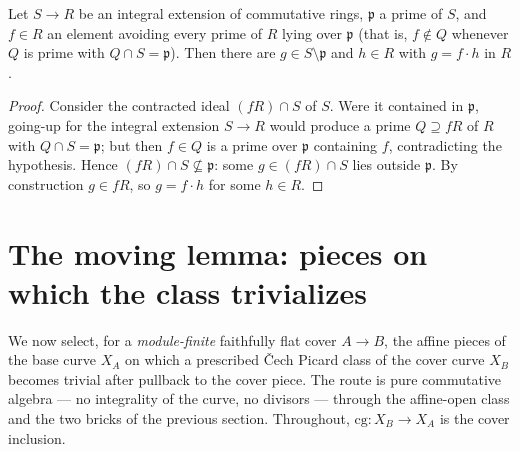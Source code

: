 \begin{lemma}
  \label{lem:algebraic_tube}
  \leanok
  Let \(S \to R\) be an integral extension of commutative rings, \(\mathfrak p\) a prime of \(S\),
  and \(f \in R\) an element avoiding every prime of \(R\) lying over \(\mathfrak p\) (that is,
  \(f \notin Q\) whenever \(Q\) is prime with \(Q \cap S = \mathfrak p\)). Then there are \(g \in S
  \setminus \mathfrak p\) and \(h \in R\) with \(g = f \cdot h\) in \(R\).
\end{lemma}
\begin{proof}
  \leanok
  Consider the contracted ideal \((fR) \cap S\) of \(S\). Were it contained in \(\mathfrak p\),
  going-up for the integral extension \(S \to R\) would produce a prime \(Q \supseteq fR\) of \(R\)
  with \(Q \cap S = \mathfrak p\); but then \(f \in Q\) is a prime over \(\mathfrak p\) containing
  \(f\), contradicting the hypothesis. Hence \((fR) \cap S \not\subseteq \mathfrak p\): some
  \(g \in (fR) \cap S\) lies outside \(\mathfrak p\). By construction \(g \in fR\), so \(g = f \cdot
  h\) for some \(h \in R\).
\end{proof}

\section{The moving lemma: pieces on which the class trivializes}
\label{sec:effectivityMoving}

We now select, for a \emph{module-finite} faithfully flat cover \(A \to B\), the affine pieces of the
base curve \(X_A\) on which a prescribed \v Cech Picard class of the cover curve \(X_B\) becomes
trivial after pullback to the cover piece. The route is pure commutative algebra --- no integrality
of the curve, no divisors --- through the affine-open class and the two bricks of the previous
section. Throughout, \(\mathrm{cg} \colon X_B \to X_A\) is the cover inclusion.

